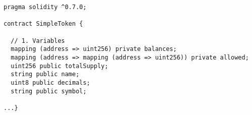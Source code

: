 \begin{lstlisting}[language=Solidity]
pragma solidity ^0.7.0;

contract SimpleToken {

  // 1. Variables
  mapping (address => uint256) private balances;
  mapping (address => mapping (address => uint256)) private allowed;
  uint256 public totalSupply;
  string public name;
  uint8 public decimals;
  string public symbol;
    
...}
\end{lstlisting}